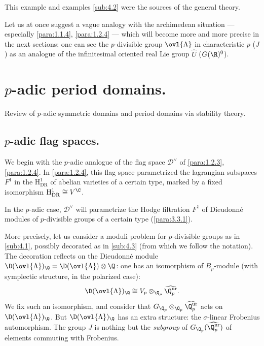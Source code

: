 \begin{para}\label{para:4.3.5} This example and examples \ref{sub:4.2}
 were the sources of the general theory. 

\noindent Let us at once suggest a vague analogy with the
archimedean situation --- especially \ref{para:1.1.4}, \ref{para:1.2.4} ---
 which will become more 
and more precise in the next sections: one can see the $p$-divisible
group $\ovl{\Lambda}$ in characteristic $p$ (\resp $J$) as an analogue
of the infinitesimal oriented real Lie group $\hat U$ (\resp $G(\R)^0$).
    
\newpage
\section{$p$-adic period domains.}\label{sec:5}

\begin{abst}
 Review of $p$-adic symmetric domains and period domains via stability theory.
\end{abst}
\end{para}


\subsection{$p$-adic flag spaces.}\label{sub:5.1}

\begin{para}\label{para:5.1.1} We begin with the $p$-adic analogue of
 the flag space $\mathcal{D}^\vee$ of \ref{para:1.2.3},
 \ref{para:1.2.4}. In \ref{para:1.2.4}, this flag space parametrized the
 lagrangian subspaces $F^1$ in the $\mathrm{H}_{\mathrm{DR}}^1$ of abelian
 varieties of a certain type, marked by a fixed isomorphism
 $\mathrm{H}_{\mathrm{DR}}^1\cong V^\C$.


In the $p$-adic case, $\mathcal{D}^\vee$ will parametrize the Hodge
filtration $F^1$ of Dieudonn\'e modules of $p$-divisible groups of a
certain type (\ref{para:3.3.1}).
\end{para}

\begin{para}\label{para:5.1.2} More precisely, let us consider a moduli
 problem for $p$-divisible groups as in \ref{sub:4.1}, possibly
 decorated as in \ref{sub:4.3} (from which we follow the notation). The
 decoration reflects on the 
 Dieudonn\'e module $\D(\ovl{\Lambda})_\Q=\D(\ovl{\Lambda})\otimes \Q$:
 one has an isomorphism of $B_p$-module (with symplectic structure, in
 the polarized case):
 \begin{equation*}
  \D(\ovl{\Lambda})_\Q\cong
   V_p\otimes_{\Q_p}\widehat{\Q_p^{\mathrm{ur}}}.
 \end{equation*}
 We fix such an isomorphism, and consider that
 $G_{\Q_p}\otimes_{\Q_p}\widehat{\Q_p^{\mathrm{ur}}}$ acts on
 $\D(\ovl{\Lambda})_\Q$. But $\D(\ovl{\Lambda})_\Q$ has an extra
 structure: the $\sigma$-linear Frobenius automorphism. The group $J$ is
 nothing but the {\it subgroup} of $G_{\Q_p}(\widehat{\Q_p^{\mathrm{ur}}})$ of
 elements commuting with Frobenius.
\end{para}

